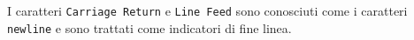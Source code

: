 \newline
I caratteri \texttt{Carriage Return} e \texttt{Line Feed} sono conosciuti come i caratteri \texttt{newline} e sono trattati come indicatori di fine linea.















%
%
%
%
